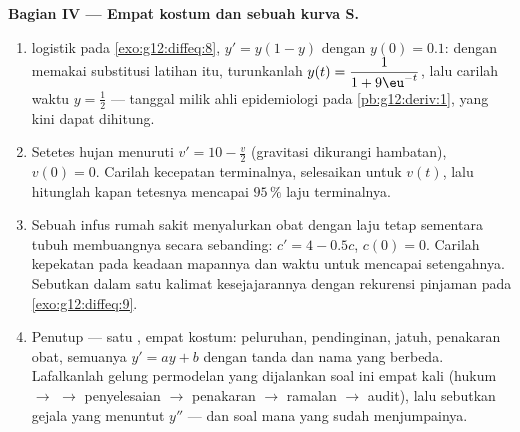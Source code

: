 \begin{problem}
\medskip
\noindent\textbf{Bagian IV --- Empat kostum dan sebuah kurva S.}
\begin{enumerate}[resume]
  \item {} logistik pada \cref{exo:g12:diffeq:8},
        $y' = y(1 - y)$ dengan $y(0) = 0.1$: dengan memakai substitusi
        latihan itu, turunkanlah
        $y(t) = \dfrac{1}{1 + 9\eu^{-t}}$, lalu carilah waktu
         $y = \frac12$ --- tanggal milik
        ahli epidemiologi pada \cref{pb:g12:deriv:1}, yang kini
        dapat dihitung.
  \item Setetes hujan menuruti $v' = 10 - \frac v2$ (gravitasi dikurangi
        hambatan), $v(0) = 0$. Carilah kecepatan terminalnya, selesaikan
        untuk $v(t)$, lalu hitunglah kapan tetesnya mencapai
        $95\,\%$ laju terminalnya.
  \item Sebuah infus rumah sakit menyalurkan obat dengan laju tetap sementara
        tubuh membuangnya secara sebanding:
        $c' = 4 - 0.5c$, $c(0) = 0$. Carilah kepekatan pada keadaan
        mapannya dan waktu untuk mencapai setengahnya. Sebutkan
        dalam satu kalimat kesejajarannya dengan rekurensi pinjaman pada
        \cref{exo:g12:diffeq:9}.
  \item Penutup --- satu , empat kostum: peluruhan, pendinginan,
        jatuh, penakaran obat, semuanya $y' = ay + b$ dengan tanda dan nama
        yang berbeda. Lafalkanlah gelung permodelan yang dijalankan soal ini
        empat kali (hukum $\to$  $\to$ penyelesaian $\to$
        penakaran $\to$ ramalan $\to$ audit), lalu sebutkan
        gejala yang menuntut $y''$ --- dan soal mana yang
        sudah menjumpainya.

\end{enumerate}
\end{problem}
